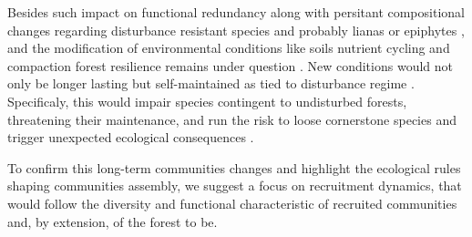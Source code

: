\documentclass[fleqn,10pt]{ArtEcoFoG} %
\theoremstyle{definition}
\theoremstyle{definition}
\theoremstyle{definition}
\theoremstyle{remark}
\begin{document}
Besides such impact on functional redundancy along with persitant
compositional changes regarding disturbance resistant species
\citep{Haddad2008} and probably lianas or epiphytes \citep{Martin2013},
and the modification of environmental conditions like soils nutrient
cycling and compaction \citep{Olander2005} forest resilience remains
under question \citep{Chazdon2003a}. New conditions would not only be
longer lasting but self-maintained as tied to disturbance regime
\citep{Burslem2000}. Specificaly, this would impair species contingent
to undisturbed forests, threatening their maintenance, and run the risk
to loose cornerstone species and trigger unexpected ecological
consequences \citep{Jones1994, Diaz2005, Gardner2007}.

To confirm this long-term communities changes and highlight the
ecological rules shaping communities assembly, we suggest a focus on
recruitment dynamics, that would follow the diversity and functional
characteristic of recruited communities and, by extension, of the forest
to be.





\end{document}
